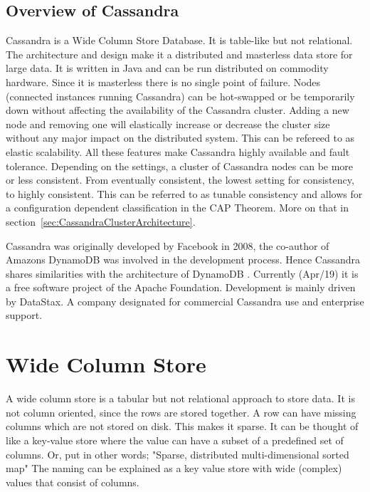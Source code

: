 \subsection{Overview of Cassandra}
Cassandra is a Wide Column Store Database. It is table-like but not relational. The architecture and design make it a distributed and masterless data store for large data. It is written in Java and can be run distributed on commodity hardware. Since it is masterless there is no single point of failure. Nodes (connected instances running Cassandra) can be hot-swapped or be temporarily down without affecting the availability of the Cassandra cluster. Adding a new node and removing one will elastically increase or decrease the cluster size without any major impact on the distributed system. This can be refereed to as elastic scalability. All these features make Cassandra highly available and fault tolerance. Depending on the settings, a cluster of Cassandra nodes can be more or less consistent. From eventually consistent, the lowest setting for consistency, to highly consistent. This can be referred to as tunable consistency and allows for a configuration dependent classification in the CAP Theorem. More on that in section~\ref{sec:CassandraClusterArchitecture}.

Cassandra was originally developed by Facebook in 2008, the co-author of Amazons DynamoDB was involved in the development process. Hence Cassandra shares similarities with the architecture of DynamoDB \autocite{cassandra_paper}.
Currently (Apr/19) it is a free software project of the Apache Foundation. Development is mainly driven by DataStax. A company designated for commercial Cassandra use and enterprise support.

\section{Wide Column Store}

A wide column store is a tabular but not relational approach to store data. It is not column oriented, since the rows are stored together. A row can have missing columns which are not stored on disk. This makes it sparse.
It can be thought of like a key-value store where the value can have a subset of a predefined set of columns. Or, put in other words; "Sparse, distributed multi-dimensional sorted map" \autocite{chang2008bigtable}
The naming can be explained as a key value store with wide (complex) values that consist of columns.

